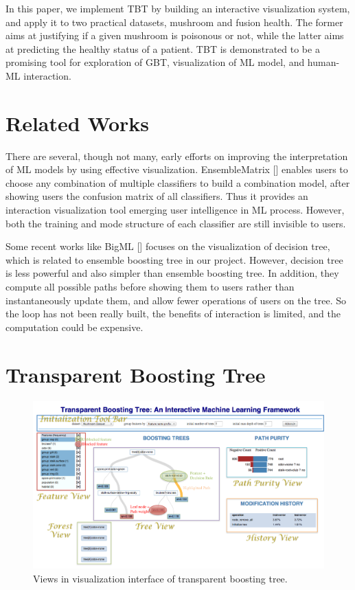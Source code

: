 \documentclass{chi2009}
\begin{document}
In this paper, we implement TBT by building an interactive visualization system, and apply it to two practical datasets, mushroom and fusion health. The former aims at justifying if a given mushroom is poisonous or not, while the latter aims at predicting the healthy status of a patient. TBT is demonstrated to be a promising tool for exploration of GBT, visualization of ML model, and human-ML interaction.

\section{Related Works}

There are several, though not many, early efforts on improving the interpretation of ML models by using effective visualization. EnsembleMatrix [] enables users to choose any combination of multiple classifiers to build a combination model, after showing users the confusion matrix of all classifiers. Thus it provides an interaction visualization tool emerging user intelligence in ML process. However, both the training and mode structure of each classifier are still invisible to users.

Some recent works like BigML [] focuses on the visualization of decision tree, which is related to ensemble boosting tree in our project. However, decision tree is less powerful and also simpler than ensemble boosting tree. In addition, they compute all possible paths before showing them to users rather than instantaneously update them, and allow fewer operations of users on the tree. So the loop has not been really built, the benefits of interaction is limited, and the computation could be expensive.

\section{Transparent Boosting Tree}

\begin{figure}[tH!]
\begin{center}
 \includegraphics[width=1\linewidth]{intface.pdf}
\end{center}
   \caption{Views in visualization interface of transparent boosting tree.}
\label{fig:interface}
\end{figure} 
\end{document}
